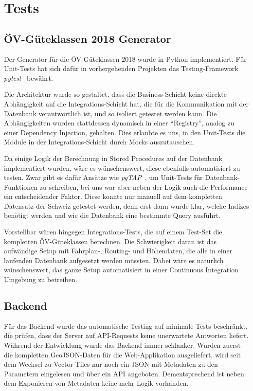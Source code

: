 \cleardoublepage
\section{Tests}
\label{Tests}

\subsection{ÖV-Güteklassen 2018 Generator}
\label{Tests:ÖV-Güteklassen 2018 Generator}

Der Generator für die \gls{ÖV-Güteklassen} 2018 wurde in Python implementiert.
Für Unit-Tests hat sich dafür in vorhergehenden Projekten das Testing-Framework \emph{pytest}~\cite{pytest} bewährt.

Die Architektur wurde so gestaltet, dass die Business-Schicht keine direkte Abhängigkeit auf die Integrations-Schicht hat, die für die Kommunikation mit der Datenbank verantwortlich ist, und so isoliert getestet werden kann.
Die Abhängigkeiten wurden stattdessen dynamisch in einer "`Registry"', analog zu einer Dependency Injection, gehalten.
Dies erlaubte es uns, in den Unit-Tests die Module in der Integrations-Schicht durch Mocks auszutauschen.

Da einige Logik der Berechnung in \glspl{Stored Procedure} auf der Datenbank implementiert wurden, wäre es wünschenswert, diese ebenfalls automatisiert zu testen.
Zwar gibt es dafür Ansätze wie \emph{pgTAP}~\cite{pgTAP}, um Unit-Tests für Datenbank-Funktionen zu schreiben, bei uns war aber neben der Logik auch die Performance ein entscheidender Faktor.
Diese konnte nur manuell auf dem kompletten Datensatz der Schweiz getestet werden, denn erst dann wurde klar, welche Indizes benötigt werden und wie die Datenbank eine bestimmte Query ausführt.

Vorstellbar wären hingegen Integrations-Tests, die auf einem Test-Set die kompletten \gls{ÖV-Güteklassen} berechnen.
Die Schwierigkeit daran ist das aufwändige Setup mit Fahrplan-, Routing- und Höhendaten, die alle in einer laufenden Datenbank aufgesetzt werden müssten.
Dabei wäre es natürlich wünschenswert, das ganze Setup automatisiert in einer Continuous Integration Umgebung zu betreiben.

\subsection{Backend}
\label{Tests:Backend}

Für das Backend wurde das automatische Testing auf minimale Tests beschränkt, die prüfen, dass der Server auf API-Requests keine unerwartete Antworten liefert.
Während der Entwicklung wurde das Backend immer schlanker.
Wurden zuerst die kompletten \gls{GeoJSON}-Daten für die Web-Applikation ausgeliefert, wird seit dem Wechsel zu Vector Tiles nur noch ein JSON mit Metadaten zu den Parametern eingelesen und über ein API angeboten.
Dementsprechend ist neben dem Exponieren von Metadaten keine mehr Logik vorhanden.


